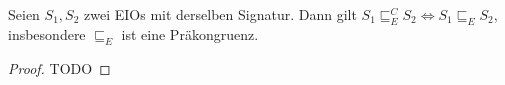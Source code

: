 \begin{satz}
  Seien $S_1, S_2$ zwei EIOs mit derselben Signatur. Dann gilt $S_1\sqsubseteq
  _E^C S_2\Leftrightarrow S_1\sqsubseteq _E S_2$, insbesondere $\sqsubseteq _E$
  ist eine Präkongruenz.
\end{satz}

\begin{proof}
  TODO
\end{proof}

